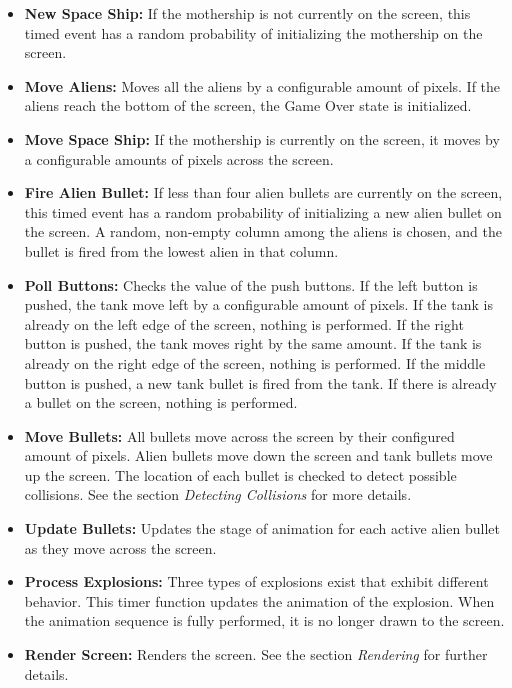 \documentclass[11pt,letter,oneside]{report}
\begin{document}
\begin{itemize}
\item \textbf{New Space Ship:} If the mothership is not currently on the screen, this timed event has a random probability of initializing the mothership on the screen.
\item  \textbf{Move Aliens:}  Moves all the aliens by a configurable amount of pixels.  If the aliens reach the bottom of the screen, the Game Over state is initialized.
\item  \textbf{Move Space Ship:}  If the mothership is currently on the screen, it moves by a configurable amounts of pixels across the screen.
\item  \textbf{Fire Alien Bullet:}  If less than four alien bullets are currently on the screen, this timed event has a random probability of initializing a new alien bullet on the screen.  A random, non-empty column among the aliens is chosen, and the bullet is fired from the lowest alien in that column.
\item  \textbf{Poll Buttons:}  Checks the value of the push buttons.  If the left button is pushed, the tank move  left by a configurable amount of pixels.  If the tank is already on the left edge of the screen, nothing is performed.  If the right button is pushed, the tank moves right by the same amount.  If the tank is already on the right edge of the screen, nothing is performed.  If the middle button is pushed, a new tank bullet is fired from the tank.  If there is already a bullet on the screen, nothing is performed.
\item  \textbf{Move Bullets:}  All bullets move across the screen by their configured amount of pixels.  Alien bullets move down the screen and tank bullets move up the screen.  The location of each bullet is checked to detect possible collisions.  See the section \textit{Detecting Collisions} for more details.
\item  \textbf{Update Bullets:}  Updates the stage of animation for each active alien bullet as they move across the screen.
\item  \textbf{Process Explosions:}  Three types of explosions exist that exhibit different behavior.  This timer function updates the animation of the explosion. When the animation sequence is fully performed, it is no longer drawn to the screen.
\item  \textbf{Render Screen:}  Renders the screen.  See the section \textit{Rendering} for further details.
\end{itemize}
\end{document}
